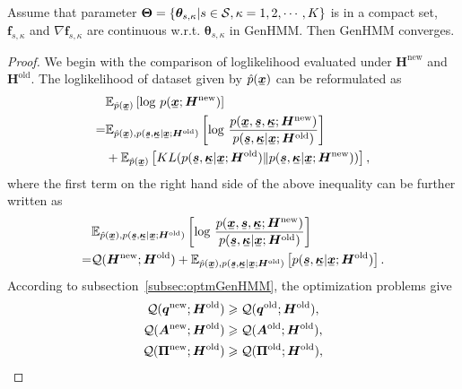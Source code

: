 \documentclass{ecai}
\newcommand{\ubar}[1]{\mkern2mu\underline{\mkern-2mu #1\mkern-2mu}\mkern2mu}
\newcommand{\ubm}[1]{\ubar{\bm{#1}}}
\begin{document}
\begin{prop}\label{proposition1}
  Assume that parameter $\bm{\Theta} = \left\{ \bm{\theta}_{s,\kappa}| s\in \mathcal{S}, \kappa=1, 2, \cdots, K \right\}$ is in a compact set,  $\bm{f}_{s,\kappa}$ and  ${\nabla\bm{f}_{s,\kappa}}$ are continuous w.r.t. ${\bm\theta}_{s,\kappa}$ in GenHMM. Then GenHMM converges.
\end{prop}

\begin{proof}
  We begin with the comparison of loglikelihood evaluated under $\bm{H}^{\mathrm{new}}$ and $\bm{H}^{\mathrm{old}}$. The loglikelihood of dataset given by $\hat{p}(\ubm{x})$ can be reformulated as
  \begin{align*}
    &\EE_{\hat{p}(\ubm{x})}\left[ \log\,p(\ubm{x};\bm{H}^{\mathrm{new}}) \right] \nonumber \\
    =& \EE_{\hat{p}(\ubm{x}),p(\ubm{s},\ubm{\kappa}| \ubm{x}; \bm{H}^{\mathrm{old}})}\left[ \log\,\frac{p(\ubm{x}, \ubm{s}, \ubm{\kappa}; \bm{H}^{\mathrm{new}})}{p(\ubm{s}, \ubm{\kappa}|\ubm{x}; \bm{H}^{\mathrm{old}})}\right] \nonumber \\
    &+ \EE_{\hat{p}(\ubm{x})}\left[ KL(p(\ubm{s}, \ubm{\kappa}|\ubm{x}; \bm{H}^{\mathrm{old}})\|p(\ubm{s}, \ubm{\kappa}|\ubm{x}; \bm{H}^{\mathrm{new}})) \right],
  \end{align*}
  where the first term on the right hand side of the above inequality can be further written as
  \begin{align*}
    &\EE_{\hat{p}(\ubm{x}),p(\ubm{s},\ubm{\kappa}| \ubm{x}; \bm{H}^{\mathrm{old}})}\left[ \log\,\frac{p(\ubm{x}, \ubm{s}, \ubm{\kappa}; \bm{H}^{\mathrm{new}})}{p(\ubm{s}, \ubm{\kappa}|\ubm{x}; \bm{H}^{\mathrm{old}})}\right] \nonumber \\
    = &\Qq(\bm{H}^{\mathrm{new}}; \bm{H}^{\mathrm{old}}) + \EE_{\hat{p}(\ubm{x}),p(\ubm{s},\ubm{\kappa}| \ubm{x}; \bm{H}^{\mathrm{old}})}\left[p(\ubm{s}, \ubm{\kappa}|\ubm{x}; \bm{H}^{\mathrm{old}})\right].
  \end{align*}
  According to subsection~\ref{subsec:optmGenHMM}, the optimization problems give
  \begin{align*}
    \Qq(\bm{q}^{\mathrm{new}}; \bm{H}^{\mathrm{old}}) &\geq \Qq(\bm{q}^{\mathrm{old}}; \bm{H}^{\mathrm{old}}),\nonumber \\
    \Qq(\bm{A}^{\mathrm{new}}; \bm{H}^{\mathrm{old}}) &\geq \Qq(\bm{A}^{\mathrm{old}}; \bm{H}^{\mathrm{old}}),\nonumber \\
    \Qq(\bm{\Pi}^{\mathrm{new}}; \bm{H}^{\mathrm{old}}) &\geq \Qq(\bm{\Pi}^{\mathrm{old}}; \bm{H}^{\mathrm{old}}), \nonumber \\

\end{align*}
\end{proof}
\end{document}

